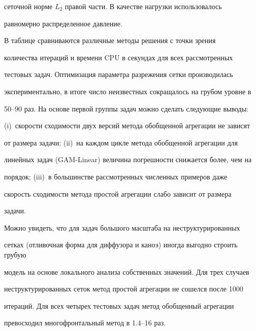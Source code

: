 сеточной норме $L_2$ правой части. В качестве нагрузки использовалось


равномерно распределенное давление.





В таблице сравниваются различные методы решения с точки зрения


количества итераций и времени CPU в секундах для всех рассмотренных


тестовых задач. Оптимизация параметра разрежения сетки производилась


экспериментально, в итоге число неизвестных сокращалось на грубом уровне в


50--90 раз. На основе первой группы задач можно сделать следующие выводы:


(i)~скорости сходимости двух версий метода обобщенной агрегации не зависят


от размера задачи; (ii)~на каждом цикле метода обобщенной агрегации для


линейных задач (GAM-Linear) величина погрешности снижается более, чем на


порядок; (iii)~в большинстве рассмотренных численных примеров даже


скорость сходимости метода простой агрегации слабо зависит от размера


задачи.





Можно увидеть, что для задач большого масштаба на неструктурированных


сетках (отливочная форма для диффузора и каноэ) иногда выгодно строить грубую


модель на основе локального анализа собственных значений. Для трех случаев


неструктурированных сеток метод простой агрегации не сошелся после 1000


итераций. Для всех четырех тестовых задач метод обобщенный агрегации


превосходил многофронтальный метод в 1.4--16 раз.


\medskip





